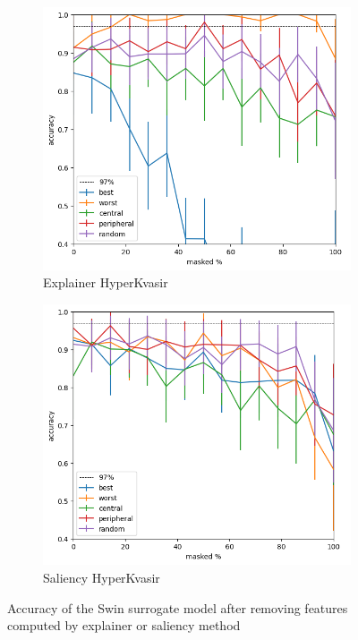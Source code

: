 \documentclass[magisterska,en]{pracamgr}
\begin{document}
\begin{figure}
\centering
\begin{subfigure}{.6\textwidth}
  \centering
  \includegraphics[width=.6\linewidth]{./images/swin_gastro_masking_explainer_patches_accuracy_half-0.png}
  \caption{Explainer HyperKvasir}
  \label{fig:sub1}
\end{subfigure}%
\begin{subfigure}{.6\textwidth}
  \centering
  \includegraphics[width=.6\linewidth]
{./images/swin_gastro_masking_saliency_patches_accuracy_half-0.png}
  \caption{Saliency HyperKvasir}
  \label{fig:sub2}
\end{subfigure}
\caption{Accuracy of the Swin surrogate model after removing features computed by explainer or saliency method}
\label{fig:Swin_Saliency_Explainer_HyperKvasir}
\end{figure}
\end{document}
